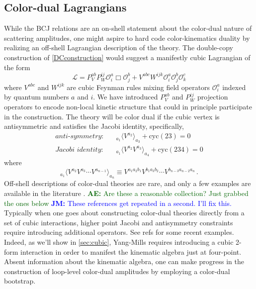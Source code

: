 \documentclass[11pt,letter]{article}
\newcommand{\ace}[1]{\textcolor{darkgreen}{\textbf{AE:}{ #1}}}
\newcommand{\jm}[1]{\textcolor{blue}{\textbf{JM: }{#1}}}
\begin{document}
\subsection{Color-dual Lagrangians}\label{offShellCK}
While the BCJ relations are an on-shell statement about the color-dual
nature of scattering amplitudes, one might aspire to hard code
color-kinematics duality by realizing an off-shell Lagrangian
description of the theory. The double-copy construction of
\cref{DCconstruction} would suggest a manifestly cubic Lagrangian of
the form
\begin{equation}
\mathcal{L} = P_V^{ab}P_W^{ij}\mathcal{O}^a_i \Box \mathcal{O}^b_j +  V^{abc} W^{ijk}\mathcal{O}^a_i \mathcal{O}^b_j \mathcal{O}^c_k
\end{equation}
where $V^{abc}$ and $W^{ijk}$ are cubic Feynman rules mixing field
operators $\mathcal{O}^{a}_i$ indexed by quantum numbers $a$ and
$i$. We have introduced $P_V^{ab}$ and $P_W^{ij}$ projection operators
to encode non-local kinetic structure that could in principle
participate in the construction.
The theory will be color dual if the cubic vertex is antisymmetric and satisfies the Jacobi identity, specifically,
\begin{align}
\textit{anti-symmetry}:& \quad{}_{a_1}\langle V^{a_2} \rangle_{a_3}+\text{cyc}(23)=0
\\
\textit{Jacobi identity}:& \quad {}_{a_1}\langle V^{a_2} V^{a_3}\rangle_{a_4}+\text{cyc}(234)=0
\end{align}
where 
\begin{equation}
{}_{a_1}\langle V^{a_2}V^{a_3}\cdots V^{a_{n-1}} \rangle_{a_n} \equiv V^{a_1a_2b_1}V^{b_1a_3b_2}\cdots V^{b_{n-3} a_{n-2}a_n}\,.
\end{equation}
Off-shell descriptions of
color-dual theories are rare, and only a few examples are available in
the literature \cite{Monteiro2011pc, Cheung:2016prv, Cheung:2021zvb,
  Cheung:2020djz, Ben-Shahar:2022ixa, Ben-Shahar:2021zww,
  Ben-Shahar:2021doh}.
\ace{Are these a reasonable collection?  Just grabbed the ones below}
\jm{These references get repeated in a second.  I'll fix this.}
Typically when one goes about constructing color-dual
theories directly from a set of cubic interactions, higher point
Jacobi and antisymmetry constraints require introducing additional
operators. See refs \cite{Ben-Shahar:2022ixa} for some recent
examples. Indeed, as we'll show in \cref{sec:cubic}, Yang-Mills
requires introducing a cubic 2-form interaction in order to manifest
the kinematic algebra just at four-point. Absent information about the
kinematic algebra, one can make progress in the construction of
loop-level color-dual amplitudes by employing a color-dual bootstrap.
\end{document}
